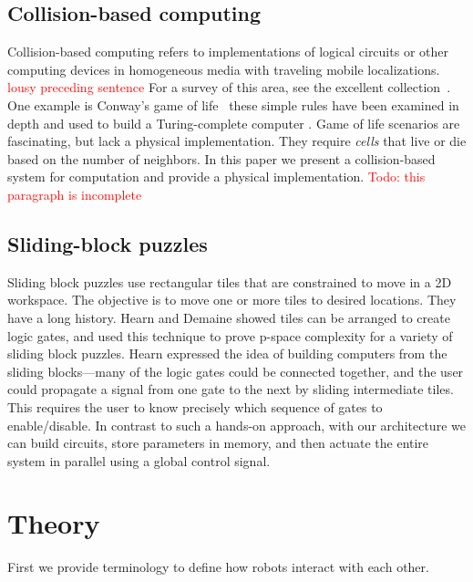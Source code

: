 \documentclass[letterpaper, 10 pt, conference]{ieeeconf}
\begin{document}
\subsection{Collision-based computing}
Collision-based computing refers to implementations of logical circuits or other computing devices in homogeneous media with traveling mobile localizations. \textcolor{red}{lousy preceding sentence}   For a survey of this area, see the excellent collection~\cite{Adamatzky2012}.  One example is Conway's game of life~\cite{berlekamp2001winning}  these simple rules have been examined in depth and used  to build a Turing-complete computer \cite{Adamatzky2002}.  Game of life scenarios are fascinating, but lack a physical implementation.  They require \emph{cells} that live or die based on the number of neighbors. In this paper we present a collision-based system for computation and provide a physical implementation.
\textcolor{red}{Todo: this paragraph is incomplete}


\subsection{Sliding-block puzzles}
Sliding block puzzles use rectangular tiles that are constrained to move in a 2D workspace. The objective is to move one or more tiles to desired locations. They have a long history.
Hearn \cite{hearn2005complexity} and Demaine \cite{Demaine2009} showed tiles can be arranged to create logic gates, and used this technique to prove {\sc p-space} complexity for a variety of sliding block puzzles.  Hearn expressed the idea of building computers from the sliding blocks---many of the logic gates could be connected together, and the user could propagate a signal from one gate to the next by sliding intermediate tiles.  This requires the user to know precisely which sequence of gates to enable/disable.  In contrast to such a hands-on approach, with our architecture we can build circuits, store parameters in memory, and then actuate the entire system in parallel using a global control signal.



\section{Theory}\label{sec:theory}

First we provide terminology to define how robots interact with each other. 
\end{document}
